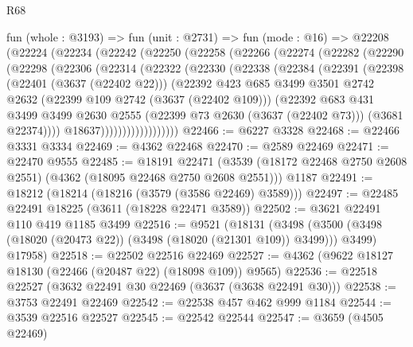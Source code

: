 \begin{lexlean}{R68}
\begin{coremodule}
    fun (whole : @3193) =>
    fun (unit : @2731) =>
    fun (mode : @16) =>
    @22208
      (@22224
        (@22234
          (@22242
            (@22250
              (@22258
                (@22266
                  (@22274
                    (@22282
                      (@22290
                        (@22298
                          (@22306
                            (@22314
                              (@22322
                                (@22330
                                  (@22338
                                    (@22384
                                      (@22391
                                        (@22398
                                          (@22401 (@3637 (@22402 @22)))
                                          (@22392
                                            @423
                                            @685
                                            @3499
                                            @3501
                                            @2742
                                            @2632
                                            (@22399 @109 @2742 (@3637 (@22402 @109)))
                                            (@22392
                                              @683
                                              @431
                                              @3499
                                              @3499
                                              @2630
                                              @2555
                                              (@22399 @73 @2630 (@3637 (@22402 @73)))
                                              (@3681 @22374))))
                                        @18637))))))))))))))))))
@22466 := @6227 @3328
@22468 := @22466 @3331 @3334
@22469 := @4362 @22468
@22470 := @2589 @22469
@22471 := @22470 @9555
@22485 := @18191
    @22471
    (@3539 (@18172 @22468 @2750 @2608 @2551) (@4362 (@18095 @22468 @2750 @2608 @2551)))
    @1187
@22491 := @18212 (@18214 (@18216 (@3579 (@3586 @22469) @3589)))
@22497 := @22485 @22491 @18225 (@3611 (@18228 @22471 @3589))
@22502 := @3621 @22491 @110 @419 @1185 @3499
@22516 := @9521
    (@18131
      (@3498 (@3500 (@3498 (@18020 (@20473 @22)) (@3498 (@18020 (@21301 @109)) @3499))) @3499)
      @17958)
@22518 := @22502 @22516 @22469
@22527 := @4362 (@9622 @18127 @18130 (@22466 (@20487 @22) (@18098 @109)) @9565)
@22536 := @22518 @22527 (@3632 @22491 @30 @22469 (@3637 (@3638 @22491 @30)))
@22538 := @3753 @22491 @22469
@22542 := @22538 @457 @462 @999 @1184
@22544 := @3539 @22516 @22527
@22545 := @22542 @22544
@22547 := @3659 (@4505 @22469)

\end{coremodule}
\end{lexlean}
